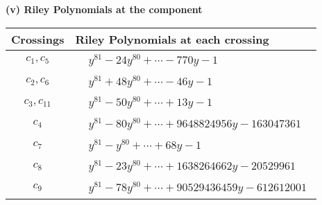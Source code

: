 \documentclass[1p]{elsarticle_modified}
\theoremstyle{definition}
\begin{document}
\newpage\renewcommand{\arraystretch}{1}
\flushleft \textbf{(v) Riley Polynomials at the component}\newline \\
\begin{tabular}{m{50pt}|m{274pt}}
Crossings & \hspace{64pt}Riley Polynomials at each crossing \\
\hline $$\begin{aligned}c_{1},c_{5}\end{aligned}$$&$\begin{aligned}
&y^{81}-24 y^{80}+\cdots-770 y-1
\end{aligned}$\\
\hline $$\begin{aligned}c_{2},c_{6}\end{aligned}$$&$\begin{aligned}
&y^{81}+48 y^{80}+\cdots-46 y-1
\end{aligned}$\\
\hline $$\begin{aligned}c_{3},c_{11}\end{aligned}$$&$\begin{aligned}
&y^{81}-50 y^{80}+\cdots+13 y-1
\end{aligned}$\\
\hline $$\begin{aligned}c_{4}\end{aligned}$$&$\begin{aligned}
&y^{81}-80 y^{80}+\cdots+9648824956 y-163047361
\end{aligned}$\\
\hline $$\begin{aligned}c_{7}\end{aligned}$$&$\begin{aligned}
&y^{81}- y^{80}+\cdots+68 y-1
\end{aligned}$\\
\hline $$\begin{aligned}c_{8}\end{aligned}$$&$\begin{aligned}
&y^{81}-23 y^{80}+\cdots+1638264662 y-20529961
\end{aligned}$\\
\hline $$\begin{aligned}c_{9}\end{aligned}$$&$\begin{aligned}
&y^{81}-78 y^{80}+\cdots+90529436459 y-612612001
\end{aligned}$\\

\end{tabular}
\end{document}
